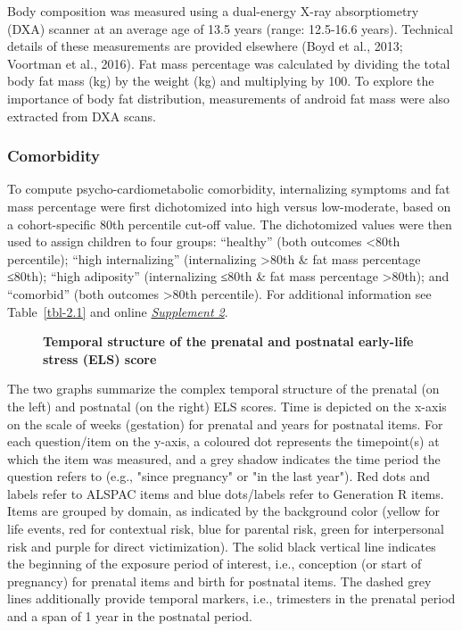\documentclass[
  letterpaper,
  DIV=11,
  numbers=noendperiod]{scrreport}
\newenvironment{fakecaption}
{
  \begingroup
  \small\itshape\color{gray}
  \setlength{\parskip}{5pt} %
  \setlength{\leftskip}{60pt} %
  \setlength{\rightskip}{0pt} %
}
{
  \par
  \endgroup
}
\begin{document}
Body composition was measured using a dual-energy X-ray absorptiometry
(DXA) scanner at an average age of 13.5 years (range: 12.5-16.6 years).
Technical details of these measurements are provided elsewhere (Boyd et
al., 2013; Voortman et al., 2016). Fat mass percentage was calculated by
dividing the total body fat mass (kg) by the weight (kg) and multiplying
by 100. To explore the importance of body fat distribution, measurements
of android fat mass were also extracted from DXA scans.

\subsubsection{Comorbidity}\label{comorbidity}

To compute psycho-cardiometabolic comorbidity, internalizing symptoms
and fat mass percentage were first dichotomized into high versus
low-moderate, based on a cohort-specific 80th percentile cut-off value.
The dichotomized values were then used to assign children to four
groups: ``healthy'' (both outcomes \textless80th percentile); ``high
internalizing'' (internalizing \textgreater80th \& fat mass percentage
≤80th); ``high adiposity'' (internalizing ≤80th \& fat mass percentage
\textgreater80th); and ``comorbid'' (both outcomes \textgreater80th
percentile). For additional information see Table~\ref{tbl-2.1} and
online \href{https://osf.io/xs29c}{\emph{Supplement 2}}.

\begin{figure}[H]


\caption{\label{fig-2.1}\textbf{Temporal structure of the prenatal and
postnatal early-life stress (ELS) score}}

\end{figure}%

\begin{fakecaption}
The two graphs summarize the complex temporal structure of the prenatal (on the left) and postnatal (on the right) ELS scores. Time is depicted on the x-axis on the scale of weeks (gestation) for prenatal and years for postnatal items. For each question/item on the y-axis, a coloured dot represents the timepoint(s) at which the item was measured, and a grey shadow indicates the time period the question refers to (e.g., "since pregnancy" or "in the last year"). Red dots and labels refer to ALSPAC items and blue dots/labels refer to Generation R items. Items are grouped by domain, as indicated by the background color (yellow for life events, red for contextual risk, blue for parental risk, green for interpersonal risk and purple for direct victimization). The solid black vertical line indicates the beginning of the exposure period of interest, i.e., conception (or start of pregnancy) for prenatal items and birth for postnatal items. The dashed grey lines additionally provide temporal markers, i.e., trimesters in the prenatal period and a span of 1 year in the postnatal period.
\end{fakecaption}
\end{document}
